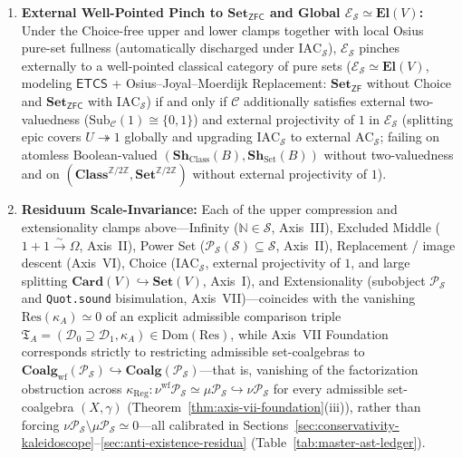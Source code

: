 \begin{theorem}
\begin{enumerate}[label=\textup{(\roman*)},leftmargin=1.8em]
  \item \textbf{External Well-Pointed Pinch to $\mathbf{Set}_{\mathsf{ZFC}}$ and Global $\mathcal{E}_{\mathcal{S}} \simeq \mathbf{El}(V)$:} Under the Choice-free upper and lower clamps together with local Osius pure-set fullness (automatically discharged under $\mathrm{IAC}_{\mathcal{S}}$), $\mathcal{E}_{\mathcal{S}}$ pinches externally to a well-pointed classical category of pure sets ($\mathcal{E}_{\mathcal{S}} \simeq \mathbf{El}(V)$, modeling $\mathsf{ETCS}$ + Osius--Joyal--Moerdijk Replacement: $\mathbf{Set}_{\mathsf{ZF}}$ without Choice and $\mathbf{Set}_{\mathsf{ZFC}}$ with $\mathrm{IAC}_{\mathcal{S}}$) if and only if $\mathcal{C}$ additionally satisfies external two-valuedness ($\mathrm{Sub}_{\mathcal{C}}(1) \cong \{0, 1\}$) and external projectivity of $1$ in $\mathcal{E}_{\mathcal{S}}$ (splitting epic covers $U \twoheadrightarrow 1$ globally and upgrading $\mathrm{IAC}_{\mathcal{S}}$ to external $\mathrm{AC}_{\mathcal{S}}$; failing on atomless Boolean-valued $(\mathbf{Sh}_{\mathrm{Class}}(B), \mathbf{Sh}_{\mathrm{Set}}(B))$ without two-valuedness and on $(\mathbf{Class}^{\mathbb{Z}/2\mathbb{Z}}, \mathbf{Set}^{\mathbb{Z}/2\mathbb{Z}})$ without external projectivity of $1$).
  \item \textbf{Residuum Scale-Invariance:} Each of the upper compression and extensionality clamps above---Infinity ($\mathbb{N} \in \mathcal{S}$, Axis~III), Excluded Middle ($1 + 1 \xrightarrow{\sim} \Omega$, Axis~II), Power Set ($\mathcal{P}_{\mathcal{S}}(\mathcal{S}) \subseteq \mathcal{S}$, Axis~II), Replacement / image descent (Axis~VI), Choice ($\mathrm{IAC}_{\mathcal{S}}$, external projectivity of $1$, and large splitting $\mathbf{Card}(V) \hookrightarrow \mathbf{Set}(V)$, Axis~I), and Extensionality (subobject $\mathcal{P}_{\mathcal{S}}$ and \texttt{Quot.sound} bisimulation, Axis~VII)---coincides with the vanishing $\mathrm{Res}(\kappa_A) \simeq 0$ of an explicit admissible comparison triple $\mathfrak{T}_A = (\mathcal{D}_0 \supseteq \mathcal{D}_1, \kappa_A) \in \mathrm{Dom}(\mathrm{Res})$, while Axis~VII Foundation corresponds strictly to restricting admissible set-coalgebras to $\mathbf{Coalg}_{\mathrm{wf}}(\mathcal{P}_{\mathcal{S}}) \hookrightarrow \mathbf{Coalg}(\mathcal{P}_{\mathcal{S}})$---that is, vanishing of the factorization obstruction across $\kappa_{\mathrm{Reg}} : \nu^{\mathrm{wf}}\mathcal{P}_{\mathcal{S}} \simeq \mu\mathcal{P}_{\mathcal{S}} \hookrightarrow \nu\mathcal{P}_{\mathcal{S}}$ for every admissible set-coalgebra $(X, \gamma)$ (Theorem~\ref{thm:axis-vii-foundation}(iii)), rather than forcing $\nu\mathcal{P}_{\mathcal{S}} \setminus \mu\mathcal{P}_{\mathcal{S}} \simeq 0$---all calibrated in Sections~\ref{sec:conservativity-kaleidoscope}--\ref{sec:anti-existence-residua} (Table~\ref{tab:master-ast-ledger}).
\end{enumerate}
\end{theorem}

